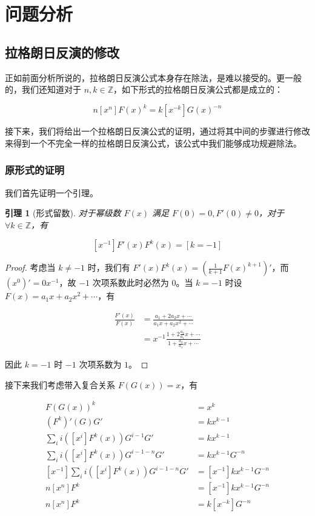 \documentclass[12pt]{ctexart}
\theoremstyle{theorem}
\newtheorem{lemma}{\bfseries\textsf {引理}}
\theoremstyle{theorem}
\begin{document}
\newpage

\section{问题分析}

\subsection{拉格朗日反演的修改}

正如前面分析所说的，拉格朗日反演公式本身存在除法，是难以接受的。更一般的，我们还知道对于 $n,k\in \mathbb Z$，如下形式的拉格朗日反演公式都是成立的：

$$
n[x^n]F(x)^k = k[x^{-k}]G(x)^{-n}
$$

接下来，我们将给出一个拉格朗日反演公式的证明，通过将其中间的步骤进行修改来得到一个不完全一样的拉格朗日反演公式，该公式中我们能够成功规避除法。

\subsubsection{原形式的证明}

我们首先证明一个引理。

\begin{lemma}[形式留数]
对于幂级数 $F(x)$ 满足 $F(0)=0, F'(0)\neq0$，对于 $\forall k\in \mathbb Z$，有

$$
[x^{-1}]F'(x)F^k(x)=[k=-1]
$$

\end{lemma}

\begin{proof} 考虑当 $k\neq -1$ 时，我们有 $F'(x)F^k(x)=(\frac 1{k+1} F(x)^{k+1})'$，而 $(x^0)'=0x^{-1}$，故 $-1$ 次项系数此时必然为 $0$。当 $k=-1$ 时设 $F(x) = a_1 x + a_2 x^2 + \cdots$，有

\begin{align*}
\frac{F'(x)}{F(x)} &= \frac{a_1 + 2a_2x + \cdots}{a_1 x + a_2 x^2 + \cdots}\\
&= x^{-1} \frac{1 + 2\frac{a_2}{a_1} x + \cdots}{1 + \frac{a_2}{a_1} x + \cdots}
\end{align*}

因此 $k=-1$ 时 $-1$ 次项系数为 $1$。

\end{proof}

接下来我们考虑带入复合关系 $F(G(x))=x$，有

\begin{align*}
F(G(x))^k &= x^k\\
(F^k)'(G)G' &= kx^{k-1}\\
\sum_{i} i([x^i] F^k(x)) G^{i-1}G' &= kx^{k-1}\\
\sum_{i} i([x^i] F^k(x)) G^{i-1-n}G' &= kx^{k-1}G^{-n}\\ 
[x^{-1}]\sum_{i} i([x^i] F^k(x)) G^{i-1-n}G' &= [x^{-1}]kx^{k-1}G^{-n}\\ 
n[x^n] F^k &= [x^{-1}]kx^{k-1}G^{-n}\\ 
n[x^n] F^k &= k[x^{-k}]G^{-n}
\end{align*}
\end{document}
